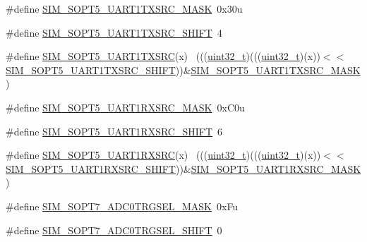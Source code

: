 \begin{DoxyCompactItemize}
\item 
\#define \hyperlink{group___s_i_m___register___masks_gac473b632c382f785d524c177ff186e0d}{S\+I\+M\+\_\+\+S\+O\+P\+T5\+\_\+\+U\+A\+R\+T1\+T\+X\+S\+R\+C\+\_\+\+M\+A\+SK}~0x30u
\item 
\#define \hyperlink{group___s_i_m___register___masks_ga7714c11e5536dacc90fbc2960e532e94}{S\+I\+M\+\_\+\+S\+O\+P\+T5\+\_\+\+U\+A\+R\+T1\+T\+X\+S\+R\+C\+\_\+\+S\+H\+I\+FT}~4
\item 
\#define \hyperlink{group___s_i_m___register___masks_ga06c2c7dfca35c10b5c05598c2c29e944}{S\+I\+M\+\_\+\+S\+O\+P\+T5\+\_\+\+U\+A\+R\+T1\+T\+X\+S\+RC}(x)                                ~(((\hyperlink{_p_e___types_8h_a33594304e786b158f3fb30289278f5af}{uint32\+\_\+t})(((\hyperlink{_p_e___types_8h_a33594304e786b158f3fb30289278f5af}{uint32\+\_\+t})(x))$<$$<$\hyperlink{group___s_i_m___register___masks_ga7714c11e5536dacc90fbc2960e532e94}{S\+I\+M\+\_\+\+S\+O\+P\+T5\+\_\+\+U\+A\+R\+T1\+T\+X\+S\+R\+C\+\_\+\+S\+H\+I\+FT}))\&\hyperlink{group___s_i_m___register___masks_gac473b632c382f785d524c177ff186e0d}{S\+I\+M\+\_\+\+S\+O\+P\+T5\+\_\+\+U\+A\+R\+T1\+T\+X\+S\+R\+C\+\_\+\+M\+A\+SK})
\item 
\#define \hyperlink{group___s_i_m___register___masks_gaf34eb14baf5894693130af7addd8aa6f}{S\+I\+M\+\_\+\+S\+O\+P\+T5\+\_\+\+U\+A\+R\+T1\+R\+X\+S\+R\+C\+\_\+\+M\+A\+SK}~0x\+C0u
\item 
\#define \hyperlink{group___s_i_m___register___masks_ga098fcb3123342f9cd96869c69d2fb7a9}{S\+I\+M\+\_\+\+S\+O\+P\+T5\+\_\+\+U\+A\+R\+T1\+R\+X\+S\+R\+C\+\_\+\+S\+H\+I\+FT}~6
\item 
\#define \hyperlink{group___s_i_m___register___masks_ga49ea8079e7dc9fbf82dee1acca0cdf10}{S\+I\+M\+\_\+\+S\+O\+P\+T5\+\_\+\+U\+A\+R\+T1\+R\+X\+S\+RC}(x)                                ~(((\hyperlink{_p_e___types_8h_a33594304e786b158f3fb30289278f5af}{uint32\+\_\+t})(((\hyperlink{_p_e___types_8h_a33594304e786b158f3fb30289278f5af}{uint32\+\_\+t})(x))$<$$<$\hyperlink{group___s_i_m___register___masks_ga098fcb3123342f9cd96869c69d2fb7a9}{S\+I\+M\+\_\+\+S\+O\+P\+T5\+\_\+\+U\+A\+R\+T1\+R\+X\+S\+R\+C\+\_\+\+S\+H\+I\+FT}))\&\hyperlink{group___s_i_m___register___masks_gaf34eb14baf5894693130af7addd8aa6f}{S\+I\+M\+\_\+\+S\+O\+P\+T5\+\_\+\+U\+A\+R\+T1\+R\+X\+S\+R\+C\+\_\+\+M\+A\+SK})
\item 
\#define \hyperlink{group___s_i_m___register___masks_gaeda70babef834cacace2c775d62bb4ae}{S\+I\+M\+\_\+\+S\+O\+P\+T7\+\_\+\+A\+D\+C0\+T\+R\+G\+S\+E\+L\+\_\+\+M\+A\+SK}~0x\+Fu
\item 
\#define \hyperlink{group___s_i_m___register___masks_ga914ced2a5cf4e7f37371d52d34d4a930}{S\+I\+M\+\_\+\+S\+O\+P\+T7\+\_\+\+A\+D\+C0\+T\+R\+G\+S\+E\+L\+\_\+\+S\+H\+I\+FT}~0

\end{DoxyCompactItemize}
